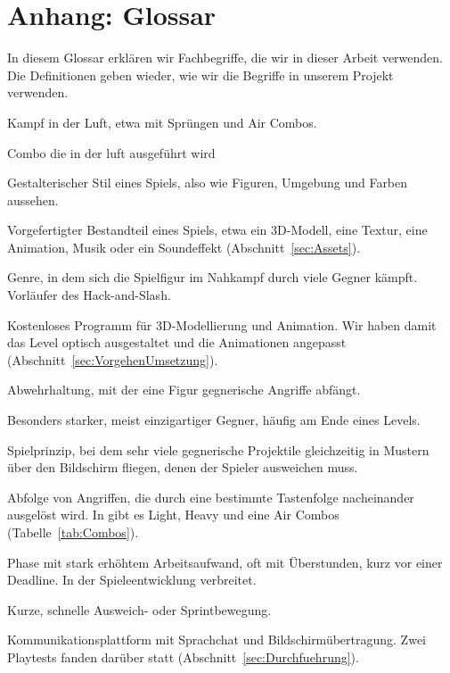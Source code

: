 \documentclass[../Main.tex]{subfiles}
\begin{document}
\newpage
\section{Anhang: Glossar} \label{sec:Glossar}

In diesem Glossar erklären wir Fachbegriffe, die wir in dieser Arbeit verwenden. Die Definitionen geben wieder, wie wir die Begriffe in unserem Projekt verwenden.

\begin{description}[style=unboxed, leftmargin=0cm, itemsep=0.3em]
\item[Air Combat] Kampf in der Luft, etwa mit Sprüngen und Air Combos.
\item[Air Combo] Combo die in der luft ausgeführt wird
\item[Artstyle] Gestalterischer Stil eines Spiels, also wie Figuren, Umgebung und Farben aussehen.
\item[Asset] Vorgefertigter Bestandteil eines Spiels, etwa ein 3D-Modell, eine Textur, eine Animation, Musik oder ein Soundeffekt (Abschnitt~\ref{sec:Assets}).
\item[Beat 'em up] Genre, in dem sich die Spielfigur im Nahkampf durch viele Gegner kämpft. Vorläufer des Hack-and-Slash.
\item[Blender] Kostenloses Programm für 3D-Modellierung und Animation. Wir haben damit das Level optisch ausgestaltet und die Animationen angepasst (Abschnitt~\ref{sec:VorgehenUmsetzung}).
\item[Block] Abwehrhaltung, mit der eine Figur gegnerische Angriffe abfängt.
\item[Bossgegner] Besonders starker, meist einzigartiger Gegner, häufig am Ende eines Levels.
\item[Bullet-Hell] Spielprinzip, bei dem sehr viele gegnerische Projektile gleichzeitig in Mustern über den Bildschirm fliegen, denen der Spieler ausweichen muss.
\item[Combo] Abfolge von Angriffen, die durch eine bestimmte Tastenfolge nacheinander ausgelöst wird. In  gibt es  Light,  Heavy und eine Air Combos (Tabelle~\ref{tab:Combos}).
\item[Crunch] Phase mit stark erhöhtem Arbeitsaufwand, oft mit Überstunden, kurz vor einer Deadline. In der Spieleentwicklung verbreitet.
\item[Dash] Kurze, schnelle Ausweich- oder Sprintbewegung.
\item[Discord] Kommunikationsplattform mit Sprachchat und Bildschirmübertragung. Zwei Playtests fanden darüber statt (Abschnitt~\ref{sec:Durchfuehrung}).

\end{description}
\end{document}
